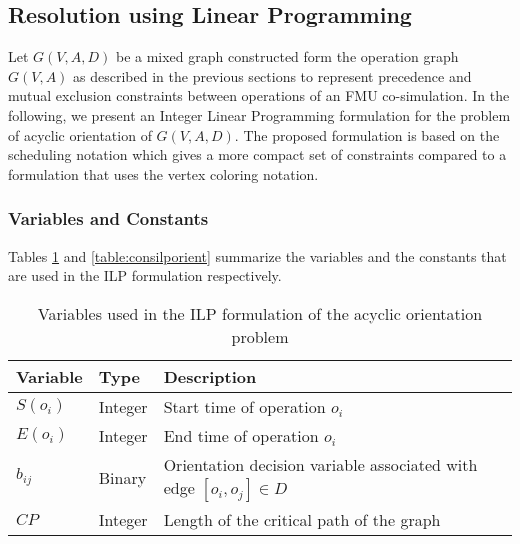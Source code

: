 %

\subsection{Resolution using Linear Programming}

Let $G(V,A,D)$ be a mixed graph constructed form the operation graph $G(V,A)$ as described in the previous sections to represent precedence and mutual exclusion constraints between operations of an FMU co-simulation. In the following, we present an Integer Linear Programming formulation for the problem of acyclic orientation of $G(V,A,D)$. The proposed formulation is based on the scheduling notation which gives a more compact set of constraints compared to a formulation that uses the vertex coloring notation.

\subsubsection{Variables and Constants}

Tables \ref{table:varilporient} and \ref{table:consilporient} summarize the variables and the constants that are used in the ILP formulation respectively.

\begin{table}[!htbp]
\caption{Variables used in the ILP formulation of the acyclic orientation problem}
\centering
\label{table:varilporient}
\begin{tabular}{l l l}
\toprule
Variable & Type & Description  \\
\midrule
 $S(o_i)$ & Integer & Start time of operation $o_i$\\
 $E(o_i)$ & Integer & End time of operation $o_i$\\
 $b_{ij}$ & Binary & Orientation decision variable associated with edge $[o_i,o_j] \in D$\\
 $CP$ & Integer & Length of the critical path of the graph\\
\bottomrule
\end{tabular}
\end{table}

